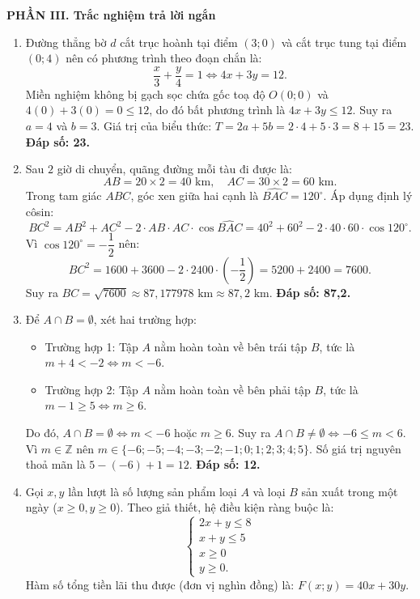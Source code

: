 \documentclass[12pt,a4paper]{article}
\begin{document}
\newpage
\textbf{\large PHẦN III. Trắc nghiệm trả lời ngắn}
\begin{enumerate}[leftmargin=0.6cm, itemsep=4pt]
    \item Đường thẳng bờ $d$ cắt trục hoành tại điểm $(3; 0)$ và cắt trục tung tại điểm $(0; 4)$ nên có phương trình theo đoạn chắn là:
    \[\dfrac{x}{3} + \dfrac{y}{4} = 1 \iff 4x + 3y = 12.\]
    Miền nghiệm không bị gạch sọc chứa gốc toạ độ $O(0; 0)$ và $4(0) + 3(0) = 0 \le 12$, do đó bất phương trình là $4x + 3y \le 12$.
    Suy ra $a = 4$ và $b = 3$.
    Giá trị của biểu thức: $T = 2a + 5b = 2 \cdot 4 + 5 \cdot 3 = 8 + 15 = 23$. \textbf{Đáp số: 23.}

    \item Sau $2$ giờ di chuyển, quãng đường mỗi tàu đi được là:
    \[AB = 20 \times 2 = 40\text{ km}, \quad AC = 30 \times 2 = 60\text{ km}.\]
    Trong tam giác $ABC$, góc xen giữa hai cạnh là $\widehat{BAC} = 120^\circ$. Áp dụng định lý côsin:
    \[BC^2 = AB^2 + AC^2 - 2 \cdot AB \cdot AC \cdot \cos \widehat{BAC} = 40^2 + 60^2 - 2 \cdot 40 \cdot 60 \cdot \cos 120^\circ.\]
    Vì $\cos 120^\circ = -\dfrac{1}{2}$ nên:
    \[BC^2 = 1600 + 3600 - 2 \cdot 2400 \cdot \left(-\dfrac{1}{2}\right) = 5200 + 2400 = 7600.\]
    Suy ra $BC = \sqrt{7600} \approx 87,177978\text{ km} \approx 87,2\text{ km}$. \textbf{Đáp số: 87,2.}

    \item Để $A \cap B = \emptyset$, xét hai trường hợp:
    \begin{itemize}
        \item Trường hợp 1: Tập $A$ nằm hoàn toàn về bên trái tập $B$, tức là $m + 4 < -2 \iff m < -6$.
        \item Trường hợp 2: Tập $A$ nằm hoàn toàn về bên phải tập $B$, tức là $m - 1 \ge 5 \iff m \ge 6$.
    \end{itemize}
    Do đó, $A \cap B = \emptyset \iff m < -6$ hoặc $m \ge 6$.
    Suy ra $A \cap B \ne \emptyset \iff -6 \le m < 6$.
    Vì $m \in \mathbb{Z}$ nên $m \in \{-6; -5; -4; -3; -2; -1; 0; 1; 2; 3; 4; 5\}$.
    Số giá trị nguyên thoả mãn là $5 - (-6) + 1 = 12$. \textbf{Đáp số: 12.}

    \item Gọi $x, y$ lần lượt là số lượng sản phẩm loại $A$ và loại $B$ sản xuất trong một ngày ($x \ge 0, y \ge 0$).
    Theo giả thiết, hệ điều kiện ràng buộc là:
    \[\begin{cases} 2x + y \le 8 \\ x + y \le 5 \\ x \ge 0 \\ y \ge 0. \end{cases}\]
    Hàm số tổng tiền lãi thu được (đơn vị nghìn đồng) là: $F(x; y) = 40x + 30y$.
    

\end{enumerate}
\end{document}
